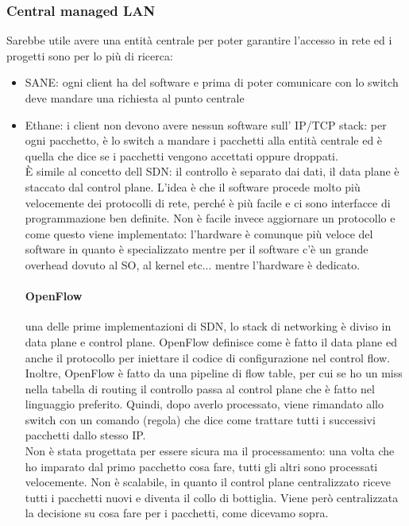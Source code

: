 \documentclass[12pt, oneside]{extbook} %
\begin{document}
\subsubsection{Central managed LAN}
Sarebbe utile avere una entità centrale per poter garantire l'accesso in rete ed i progetti sono per lo più di ricerca:
\begin{itemize}
\item SANE: ogni client ha del software e prima di poter comunicare con lo switch deve mandare una richiesta al punto centrale
\item Ethane: i client non devono avere nessun software sull' IP/TCP stack: per ogni pacchetto, è lo switch a mandare i pacchetti alla entità centrale ed è quella che dice se i pacchetti vengono accettati oppure droppati.\\ È simile al concetto dell SDN: il controllo è separato dai dati, il data plane è staccato dal control plane. L'idea è che il software procede molto più velocemente dei protocolli di rete, perché è più facile e ci sono interfacce di programmazione ben definite. Non è facile invece aggiornare un protocollo e come questo viene implementato: l'hardware è comunque più veloce del software in quanto è specializzato mentre per il software c'è un grande overhead dovuto al SO, al kernel etc... mentre l'hardware è dedicato.
\paragraph{OpenFlow} una delle prime implementazioni di SDN, lo stack di networking è diviso in data plane e control plane. OpenFlow definisce come è fatto il data plane ed anche il protocollo per iniettare il codice di configurazione nel control flow. Inoltre, OpenFlow è fatto da una pipeline di flow table, per cui se ho un miss nella tabella di routing il controllo passa al control plane che è fatto nel linguaggio preferito. Quindi, dopo averlo processato, viene rimandato allo switch con un comando (regola) che dice come trattare tutti i successivi pacchetti dallo stesso IP.\\ Non è stata progettata per essere sicura ma il processamento: una volta che ho imparato dal primo pacchetto cosa fare, tutti gli altri sono processati velocemente. Non è scalabile, in quanto il control plane centralizzato riceve tutti i pacchetti nuovi e diventa il collo di bottiglia. Viene però centralizzata la decisione su cosa fare per i pacchetti, come dicevamo sopra.
\end{itemize}
\end{document}
